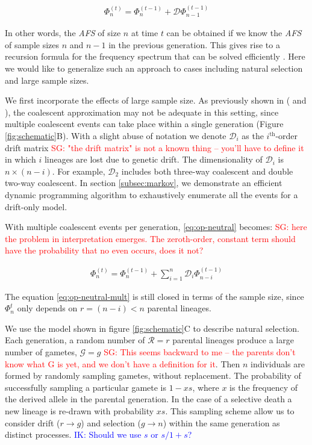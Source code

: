 \documentclass[review]{elsarticle}
\newcommand{\ra}{\rightarrow}
\newcommand{\sgcomment}[1]{\textcolor{red}{SG: #1}}
\newcommand{\ikcomment}[1]{\textcolor{blue}{IK: #1}}
\begin{document}
\begin{align}
  \label{eq:op-neutral}
  \Phi_{n}^{(t)}=\Phi_{n}^{(t-1)}+\mathcal{D} \Phi_{n-1}^{(t-1)}
\end{align}

In other words, the \textit{AFS} of size $n$ at time $t$ can be obtained if we know the \textit{AFS}
of sample sizes $n$ and $n-1$ in the previous generation. This gives rise to a recursion formula for
the frequency spectrum that can be solved efficiently \citep{JouganousEtAl2017}. Here we would like
to generalize such an approach to cases including natural selection and large sample sizes.

We first incorporate the effects of large sample size. As previously shown in
(\cite{BhaskarEtAl2014} and \cite{NelsonEtAl2019}), the coalescent approximation may not be adequate in this
setting, since multiple coalescent events can take place within a single generation
(Figure \ref{fig:schematic}B). With a slight abuse of notation we denote $\mathcal{D}_i$ as the
$i^{\text{th}}$-order drift matrix \sgcomment{"the drift matrix" is not a known thing -- you'll have to define it} in which $i$ lineages are lost due to genetic drift. The
dimensionality of $\mathcal{D}_i$ is $n \times (n-i)$. For example, $\mathcal{D}_2$ includes both
three-way coalescent and double two-way coalescent. In section \ref{subsec:markov}, we demonstrate an
efficient dynamic programming algorithm to exhaustively enumerate all the events for a drift-only
model.

With multiple coalescent events per generation, \eqref{eq:op-neutral} becomes: \sgcomment {here the problem in interpretation emerges. The zeroth-order, constant term should have the probability that no even occurs, does it not?}

\begin{align}
  \label{eq:op-neutral-mult}
  \Phi_{n}^{(t)}=\Phi_{n}^{(t-1)}+\sum_{i=1}^{n}\mathcal{D}_i \Phi_{n-i}^{(t-1)}
\end{align}

The equation \eqref{eq:op-neutral-mult} is still closed in terms of the sample size, since
$\Phi_{n}^{t}$ only depends on $r=(n-i)<n$ parental lineages. 

We use the model shown in figure \ref{fig:schematic}C to describe
natural selection. Each generation, a random number of $\mathcal{R}=r$ parental lineages produce a large number
of gametes, $\mathcal{G}=g$ \sgcomment{This seems backward to me -- the parents don't know what G is yet, and we don't have a definition for it}. Then $n$ individuals are formed by randomly sampling gametes, without
replacement. The probability of successfully sampling a particular gamete is $1-xs$, where $x$ is
the frequency of the derived allele in the parental generation. In the case of a selective death a
new lineage is re-drawn with probability $xs$. This sampling scheme allow us to consider drift ($r
\ra g$) and selection ($g \ra n$) within the same generation as distinct processes.
\ikcomment{Should we use $s$ or $s/1+s$?}
 
\end{document}
